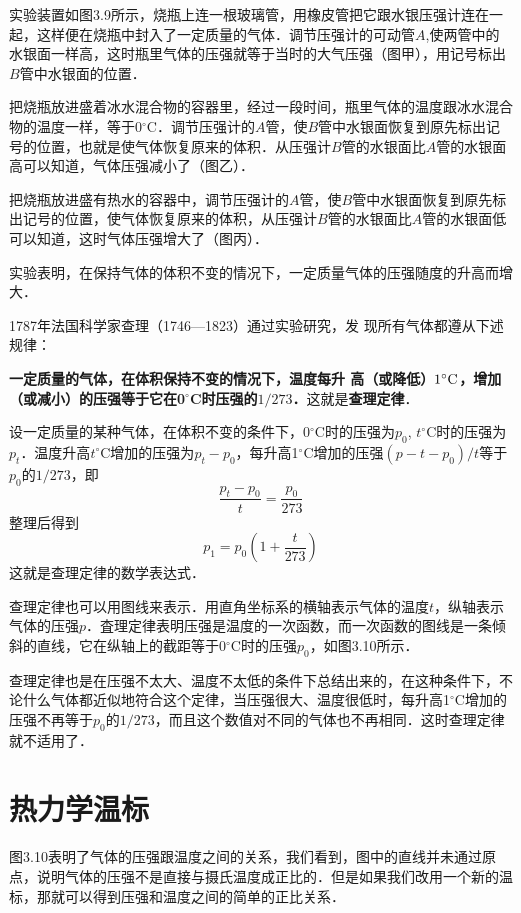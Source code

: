 实验装置如图3.9所示，烧瓶上连一根玻璃管，用橡皮管把它跟水银压强计连在一起，这样便在烧瓶中封入了一定质量的气体．调节压强计的可动管$A$,使两管中的水银面一样高，这时瓶里气体的压强就等于当时的大气压强（图甲），用记号标出$B$管中水银面的位置．

把烧瓶放进盛着冰水混合物的容器里，经过一段时间，瓶里气体的温度跟冰水混合物的温度一样，等于0$^\circ$C．调节压强计的$A$管，使$B$管中水银面恢复到原先标出记号的位置，也就是使气体恢复原来的体积．从压强计$B$管的水银面比$A$管的水银面高可以知道，气体压强减小了（图乙）．

把烧瓶放进盛有热水的容器中，调节压强计的$A$管，使$B$管中水银面恢复到原先标出记号的位置，使气体恢复原来的体积，从压强计$B$管的水银面比$A$管的水银面低可以知道，这时气体压强增大了（图丙）．

实验表明，在保持气体的体积不变的情况下，一定质量气体的压强随度的升高而增大．

1787年法国科学家查理（1746—1823）通过实验研究，发
现所有气体都遵从下述规律：

\textbf{一定质量的气体，在体积保持不变的情况下，温度每升
高（或降低）$1^\circ{\rm C}$，增加（或减小）的压强等于它在0$^\circ$C时压强的$1/273$．}这就是\textbf{查理定律}．

设一定质量的某种气体，在体积不变的条件下，0$^\circ$C时的压强为$p_0$, $t^\circ$C时的压强为$p_t$．温度升高$t^\circ$C增加的压强为$p_t-p_0$，每升高1$^\circ$C增加的压强$(p-t-p_0)/t$等于$p_0$的$1/273$，即
\[\frac{p_t-p_0}{t}=\frac{p_0}{273} \]
整理后得到
\[p_1=p_0 \left(1+\frac{t}{273}\right)\]
这就是查理定律的数学表达式．

查理定律也可以用图线来表示．用直角坐标系的横轴表示气体的温度$t$，纵轴表示气体的压强$p$．査理定律表明压强是温度的一次函数，而一次函数的图线是一条倾斜的直线，它在纵轴上的截距等于0$^\circ$C时的压强$p_0$，如图3.10所示．

查理定律也是在压强不太大、温度不太低的条件下总结出来的，在这种条件下，不论什么气体都近似地符合这个定律，当压强很大、温度很低时，每升高1$^\circ$C增加的压强不再等于$p_0$的$1/273$，而且这个数值对不同的气体也不再相同．这时查理定律就不适用了．


\section{热力学温标}
图3.10表明了气体的压强跟温度之间的关系，我们看到，图中的直线并未通过原点，说明气体的压强不是直接与摄氏温度成正比的．但是如果我们改用一个新的温标，那就可以得到压强和温度之间的简单的正比关系．

